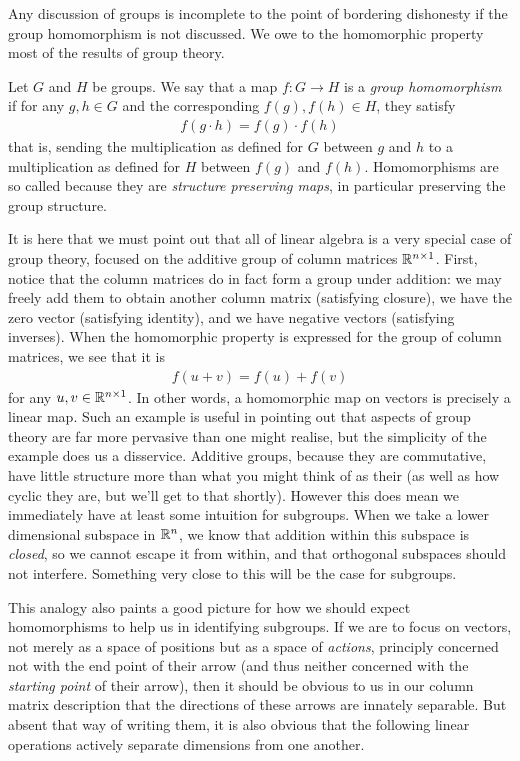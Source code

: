 \documentclass[11pt]{article}
\begin{document}
Any discussion of groups is incomplete to the point of bordering dishonesty if the group homomorphism is not discussed. We owe to the homomorphic property most of the results of group theory.

\begin{definition}
Let $G$ and $H$ be groups. We say that a map $f\colon G \to H$ is a \emph{group homomorphism} if for any $g,h \in G$ and the corresponding $f(g),f(h) \in H$, they satisfy \begin{gather*}
f(g\cdot h) = f(g) \cdot f(h)
\end{gather*}
that is, sending the multiplication as defined for $G$ between $g$ and $h$ to a multiplication as defined for $H$ between $f(g)$ and $f(h)$. Homomorphisms are so called because they are \emph{structure preserving maps}, in particular preserving the group structure.
\end{definition}

It is here that we must point out that all of linear algebra is a very special case of group theory, focused on the additive group of column matrices $\mathbb{R}^{n \times 1}$. First, notice that the column matrices do in fact form a group under addition: we may freely add them to obtain another column matrix (satisfying closure), we have the zero vector (satisfying identity), and we have negative vectors (satisfying inverses). When the homomorphic property is expressed for the group of column matrices, we see that it is \begin{gather*}
f(u + v) = f(u) + f(v)
\end{gather*}
for any $u,v \in \mathbb{R}^{n\times 1}$. In other words, a homomorphic map on vectors is precisely a linear map. Such an example is useful in pointing out that aspects of group theory are far more pervasive than one might realise, but the simplicity of the example does us a disservice. Additive groups, because they are commutative, have little structure more than what you might think of as their  (as well as how cyclic they are, but we'll get to that shortly). However this does mean we immediately have at least some intuition for subgroups. When we take a lower dimensional subspace in $\mathbb{R}^n$, we know that addition within this subspace is \emph{closed}, so we cannot escape it from within, and that orthogonal subspaces should not interfere. Something very close to this will be the case for subgroups.

This analogy also paints a good picture for how we should expect homomorphisms to help us in identifying subgroups. If we are to focus on vectors, not merely as a space of positions but as a space of \emph{actions}, principly concerned not with the end point of their arrow (and thus neither concerned with the \emph{starting point} of their arrow), then it should be obvious to us in our column matrix description that the directions of these arrows are innately separable. But absent that way of writing them, it is also obvious that the following linear operations actively separate dimensions from one another.
\end{document}
